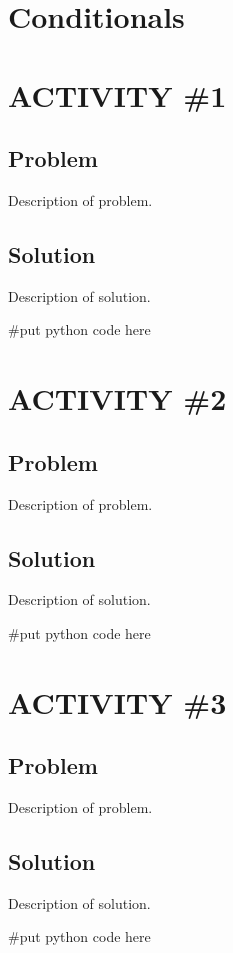 \documentclass[14pt]{extreport}%
\begin{document}
\section*{Conditionals }


\section*{ACTIVITY \#1} 
\subsection*{Problem}
Description of problem.
\subsection*{Solution}
Description of solution.\\
\begin{python}
#put python code here

\end{python}

\section*{ACTIVITY \#2} 
\subsection*{Problem}
Description of problem.

\subsection*{Solution}
Description of solution.\\
\begin{python}
#put python code here
\end{python}

\section*{ACTIVITY \#3} 
\subsection*{Problem}
Description of problem.
\subsection*{Solution}
Description of solution. \\
\begin{python}
#put python code here
\end{python}
\end{document}
